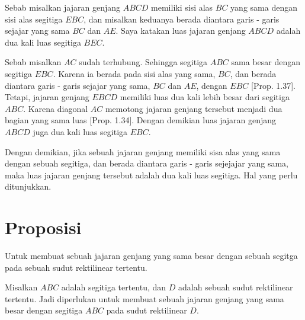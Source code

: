 \documentclass[a4paper]{book}
\begin{document}
\begin{center}
\end{center}

Sebab misalkan jajaran genjang $ABCD$ memiliki sisi alas $BC$ yang sama dengan
sisi alas segitiga $EBC$, dan misalkan keduanya berada diantara garis - garis
sejajar yang sama $BC$ dan $AE$. Saya katakan luas jajaran genjang $ABCD$ 
adalah dua kali luas segitiga $BEC$.

Sebab misalkan $AC$ sudah terhubung. Sehingga segitiga $ABC$ sama besar
dengan segitiga $EBC$. Karena ia berada pada sisi alas yang sama, $BC$, dan 
berada diantara garis - garis sejajar yang sama, $BC$ dan $AE$, dengan $EBC$
[Prop. 1.37]. Tetapi, jajaran genjang $EBCD$ memiliki luas dua kali lebih
besar dari segitiga $ABC$. Karena diagonal $AC$ memotong jajaran genjang 
tersebut menjadi dua bagian yang sama luas [Prop. 1.34]. Dengan demikian 
luas jajaran genjang $ABCD$  juga dua kali luas segitiga $EBC$.

Dengan demikian, jika sebuah jajaran genjang memiliki sisa alas yang sama
dengan sebuah segitiga, dan berada diantara garis - garis sejejajar yang
sama, maka luas jajaran genjang tersebut adalah dua kali luas segitiga.
Hal yang perlu ditunjukkan.

\section*{\centering Proposisi \thesection} 
Untuk membuat sebuah jajaran genjang yang sama besar dengan sebuah segitga
pada sebuah sudut rektilinear tertentu.
\begin{center}
\end{center}
Misalkan $ABC$ adalah segitiga tertentu, dan $D$ adalah sebuah sudut 
rektilinear tertentu. Jadi diperlukan untuk membuat sebuah jajaran genjang
yang sama besar dengan segitiga $ABC$ pada sudut rektilinear $D$.
\end{document}
